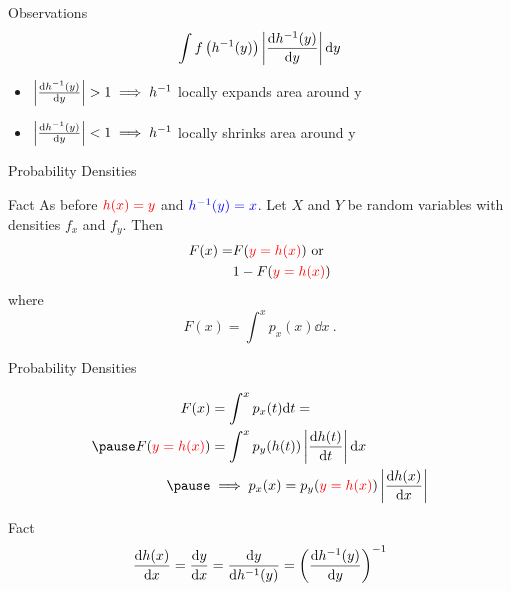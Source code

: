 \documentclass[14pt, aspectratio=169]{beamer}
\begin{document}
\begin{frame}{Observations}
\begin{equation*}
\int f\left(h^{-1}(y)\right)\left|\dv{h^{-1}(y)}{y}\right| \dd y
\end{equation*}
\begin{itemize}
\pause
\item $ \left|\dv{h^{-1}(y)}{y}\right| > 1 \implies h^{-1} $ locally expands area around y  
\pause
\item $ \left|\dv{h^{-1}(y)}{y}\right| < 1 \implies h^{-1} $ locally shrinks area around y
\end{itemize}
\end{frame}

\begin{frame}{Probability Densities}
\begin{block}{Fact}
As before $ \textcolor{red}{h(x) = y} $ and $ \textcolor{blue}{h^{-1}(y) = x} $. Let $ X $ and $ Y $ be random variables with densities $ f_{x} $ and $ f_{y} $. Then
\begin{equation*}
\begin{aligned}
F(x) = &F(\textcolor{red}{y=h(x)}) \text{ or} \\
&1 - F(\textcolor{red}{y=h(x)})
\end{aligned}
\end{equation*}
where
\begin{equation*}
F(x) = \int^{x} p_{x}(x) \dd x \ .
\end{equation*}
\end{block}
\end{frame}

\begin{frame}{Probability Densities}
\begin{small}
\begin{equation*}
\begin{aligned}
F(x) &= \int^{x} p_{x}(t) \dd t = \\
\pause
F(\textcolor{red}{y=h(x)}) &= \int^{x} p_{y}(h(t))\left|\dv{h(t)}{t}\right| \dd x \\
\pause
&\implies p_{x}(x) = p_{y}(\textcolor{red}{y=h(x)})\left|\dv{h(x)}{x}\right|
\end{aligned}
\end{equation*}
\pause
\begin{block}{Fact}
\begin{equation*}
\dv{h(x)}{x} = \dv{y}{x} = \dv{y}{h^{-1}(y)} = \left(\dv{h^{-1}(y)}{y}\right)^{-1}
\end{equation*}
\end{block}
\end{small}
\end{frame}
\end{document}

